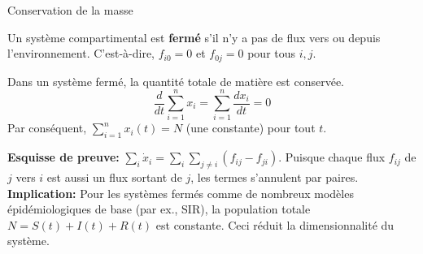 \documentclass[aspectratio=169]{beamer}\usepackage[]{graphicx}\usepackage[]{xcolor}
\begin{document}
\begin{frame}{Conservation de la masse}
    \begin{definition}
        Un système compartimental est \textbf{fermé} s'il n'y a pas de flux vers ou depuis l'environnement. C'est-à-dire, $f_{i0} = 0$ et $f_{0j} = 0$ pour tous $i, j$.
    \end{definition}
    \vfill
    \begin{theorem}
        Dans un système fermé, la quantité totale de matière est conservée.
        $$ \frac{d}{dt} \sum_{i=1}^n x_i = \sum_{i=1}^n \frac{dx_i}{dt} = 0 $$
        Par conséquent, $\sum_{i=1}^n x_i(t) = N$ (une constante) pour tout $t$.
    \end{theorem}
    \vfill
    \textbf{Esquisse de preuve:}
    $\sum_i \dot{x}_i = \sum_i \sum_{j \neq i} (f_{ij} - f_{ji})$. Puisque chaque flux $f_{ij}$ de $j$ vers $i$ est aussi un flux sortant de $j$, les termes s'annulent par paires.
    \vfill
    \textbf{Implication:} Pour les systèmes fermés comme de nombreux modèles épidémiologiques de base (par ex., SIR), la population totale $N = S(t) + I(t) + R(t)$ est constante. Ceci réduit la dimensionnalité du système.
\end{frame}
\end{document}
